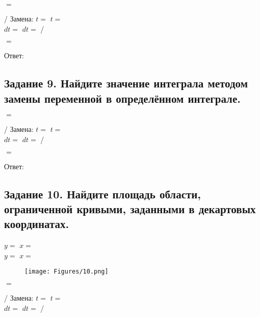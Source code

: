 \documentclass[12pt]{article}
\begin{document}
$=$\vspace{2.5mm}

/ Замена: $t= $  \hspace{2.5mm}  $t=$ \vspace{2.5mm}\\
$dt=$ \hspace{2.5mm} $dt=$ /\vspace{2.5mm}

$=$\vspace{2.5mm}

Ответ: $ $

\subsection*{Задание 9. Найдите значение интеграла методом замены переменной в
определённом интеграле.}

$=$\vspace{2.5mm}

/ Замена: $t= $  \hspace{2.5mm}  $t=$ \vspace{2.5mm}\\
$dt=$ \hspace{2.5mm} $dt=$ /\vspace{2.5mm}


$=$\vspace{2.5mm}

Ответ: $ $

\subsection*{Задание 10. Найдите площадь области, ограниченной кривыми, заданными в
декартовых координатах.}

$y=$\hspace{2.5mm} $x=$ \vspace{2.5mm}\\
$y=$\hspace{2.5mm} $x=$ \vspace{2.5mm}

\begin{figure}[ht!]
\centering
\texttt{[image: Figures/10.png]}
\end{figure}

$=$\vspace{2.5mm}

/ Замена: $t= $  \hspace{2.5mm}  $t=$ \vspace{2.5mm}\\
$dt=$ \hspace{2.5mm} $dt=$ /\vspace{2.5mm}
\end{document}
